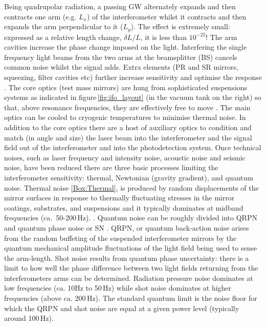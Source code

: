 Being quadrupolar radiation, a passing \ac{GW}  alternately expands and then contracts one arm (e.g. $L_x$) of the interferometer whilst it contracts and then expands the arm perpendicular to it ($L_y$).  The effect is extremely small: expressed as a relative length change, $\delta L/L$, it is less than $10^{-22}$! The arm cavities increase the phase change imposed on the light. Interfering the single frequency light beams from the two arms at the beamsplitter (BS) cancels common noise whilst the signal adds. Extra elements (\ac{PR} and \ac{SR} mirrors, squeezing, filter cavities etc)  further increase sensitivity and optimise the response \cite{InterferometerTechniquesBond2017}.  
The core optics (test mass mirrors) are hung from sophisticated suspensions systems as indicated in figure\,\ref{fig:ifo_layout} (in the vacuum tank on the right) so that, above resonance frequencies, they are effectively free to move \cite{SuspensionsvVeggel2018}. The main optics can be cooled to cryogenic temperatures to minimise thermal noise. In addition to the  core optics there are a host of auxiliary optics to condition  and match (in angle and size) the laser beam into the interferometer  and the signal field out of the interferometer and into the photodetection system. Once technical noises, such as laser frequency and intensity noise, acoustic noise and seismic noise, have been reduced there are three basic processes limiting the interferometer sensitivity: thermal, Newtonian (gravity gradient), and quantum noise. Thermal noise \ref{Box:Thermal},\cite{ThermalNoiseHammond2014} is produced by random displacements of the mirror surfaces in response to thermally fluctuating stresses in the mirror coatings, substrates, and suspensions and it typically dominates at midband frequencies  (ca.~50-200\,Hz). . Quantum noise can be roughly divided into \ac{QRPN} and quantum phase noise or \ac{SN} \cite{QuantumNoiseBarsotti2018}. \ac{QRPN}, or quantum back-action noise arises from the random buffeting of the suspended interferometer mirrors by the quantum mechanical amplitude fluctuations of the light field being used to sense the arm-length. Shot noise results from quantum phase uncertainty: there is a limit to how well the phase difference between two light fields returning from the interferometers arms can be determined. Radiation pressure noise dominates at low frequencies (ca. 10Hz to 50\,Hz) while shot noise dominates at higher frequencies (above ca. 200\,Hz). The standard quantum limit is the noise floor for which the \ac{QRPN} and shot noise are equal at a given power level (typically around 100\,Hz). 
